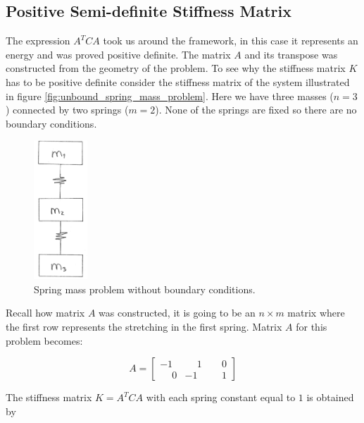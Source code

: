 \subsection{Positive Semi-definite Stiffness Matrix}
The expression $A^T C A$ took us around the framework, in this
case it represents an
energy and was proved positive definite. The matrix $A$ and its
transpose was constructed from the geometry of the problem. To see why
the stiffness matrix $K$ has to be positive 
definite consider the stiffness matrix of the system illustrated in 
figure \vref{fig:unbound_spring_mass_problem}. Here we have three masses
($n=3$) connected by two springs ($m=2$). None of the springs are
fixed so there are no boundary conditions. 

\begin{figure}
  \centering
  \includegraphics[width=2cm]{./images/equilibrium_framework_unbound_spring_mass_problem.png}
\caption{Spring mass problem without boundary conditions.}
\label{fig:unbound_spring_mass_problem}
\end{figure}
 
Recall how matrix $A$ was constructed, it is going to be an $n \times m$
matrix where the first
row represents the stretching in the first spring.
Matrix $A$ for this problem becomes:

\begin{equation*}
A =
\begin{bmatrix}
           -1 & \phantom{-}1 & \phantom{-}0 \\
 \phantom{-}0 &           -1 & \phantom{-}1 
\end{bmatrix}
\end{equation*}

The stiffness matrix $K = A^T C A$ with each spring constant
equal to $1$ is obtained by

